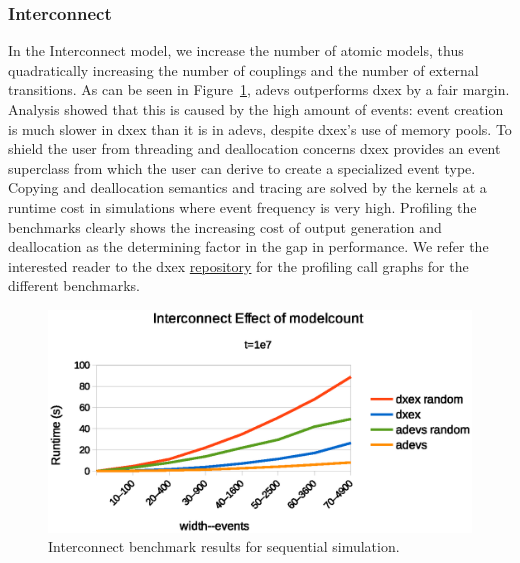 \subsubsection{Interconnect}
\label{4-seq-Interconnect}
In the Interconnect model, we increase the number of atomic models, thus quadratically increasing the number of couplings and the number of external transitions.
As can be seen in Figure~\ref{fig:Interconnect_benchmark}, adevs outperforms dxex by a fair margin.
Analysis showed that this is caused by the high amount of events: event creation is much slower in dxex than it is in adevs, despite dxex's use of memory pools.
To shield the user from threading and deallocation concerns dxex provides an event superclass from which the user can derive to create a specialized event type.
Copying and deallocation semantics and tracing are solved by the kernels at a runtime cost in simulations where event frequency is very high.
Profiling the benchmarks clearly shows the increasing cost of output generation and deallocation as the determining factor in the gap in performance.
We refer the interested reader to the dxex \hyperref{https://bitbucket.org/bcardoen/devs-ex-machina}{}{repo}{repository} for the profiling call graphs for the different benchmarks.

\begin{figure}
	\center
	\includegraphics[width=\columnwidth]{fig/interconnect_sequential.eps}
	\caption{Interconnect benchmark results for sequential simulation.}
	\label{fig:Interconnect_benchmark}
\end{figure}

